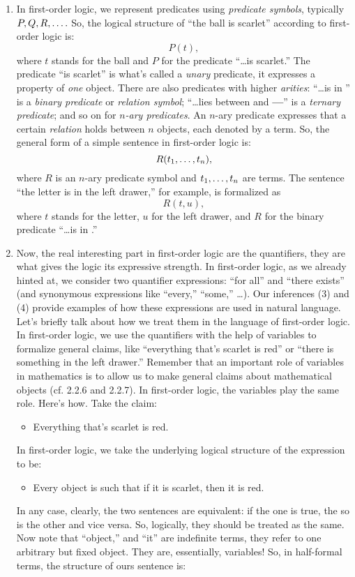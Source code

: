 \begin{enumerate}[\thesection.1]
		\item In first-order logic, we represent predicates using \emph{predicate symbols}, typically $P,Q,R, \mathellipsis.$ So, the logical structure of ``the ball is scarlet'' according to first-order logic is: \[P(t),\] where $t$ stands for the ball and $P$ for the predicate ``\dots is scarlet.'' The predicate ``is scarlet'' is what's called a \emph{unary} predicate, it expresses a property of \emph{one} object. There are also predicates with higher \emph{arities}: ``\dots is in \underline{\phantom{\dots}}'' is a \emph{binary predicate} or \emph{relation symbol}; ``\dots lies between \underline{\phantom{\dots}} and \textbf{---}'' is a \emph{ternary predicate}; and so on for \emph{$n$-ary predicates}. An $n$-ary predicate expresses that a certain \emph{relation} holds between $n$ objects, each denoted by a term. So, the general form of a simple sentence in first-order logic is: \[R(t_1, \mathellipsis, t_n),\] where $R$ is an $n$-ary predicate symbol and $t_1,\mathellipsis, t_n$ are terms. The sentence ``the letter is in the left drawer,'' for example, is formalized as \[R(t, u),\] where $t$ stands for the letter, $u$ for the left drawer, and $R$ for the binary predicate ``\dots is in \underline{\phantom{\dots}}.''
		
		\item Now, the real interesting part in first-order logic are the quantifiers, they are what gives the logic its expressive strength. In first-order logic, as we already hinted at, we consider two quantifier expressions: ``for all'' and ``there exists'' (and synonymous expressions like ``every,'' ``some,'' \dots). Our inferences (3) and (4) provide examples of how these expressions are used in natural language. Let's briefly talk about how we treat them in the language of first-order logic. In first-order logic, we use the quantifiers with the help of variables to formalize general claims, like ``everything that's scarlet is red'' or ``there is something in the left drawer.'' Remember that an important role of variables in mathematics is to allow us to make general claims about mathematical objects (cf. 2.2.6 and 2.2.7). In first-order logic, the variables play the same role. Here's how. Take the claim:
		\begin{itemize}
		\item Everything that's scarlet is red.
		\end{itemize}
In first-order logic, we take the underlying logical structure of the expression to be:
	\begin{itemize}
		\item Every object is such that if it is scarlet, then it is red.
	\end{itemize} 
In any case, clearly, the two sentences are equivalent: if the one is true, the so is the other and vice versa. So, logically, they should be treated as the same. Now note that ``object,'' and ``it'' are indefinite terms, they refer to one arbitrary but fixed object. They are, essentially, variables! So, in half-formal terms, the structure of ours sentence is:
	\begin{itemize}
	

\end{itemize}
\end{enumerate}
